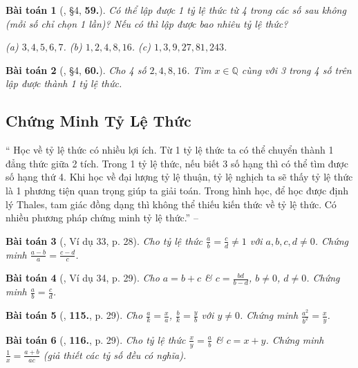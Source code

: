 \documentclass{article}
\newtheorem{baitoan}{Bài toán}
\begin{document}
\begin{baitoan}[\cite{Binh_Toan_7_tap_1}, \S4, \textbf{59.}]
	Có thể lập được 1 tỷ lệ thức từ 4 trong các số sau không (mỗi số chỉ chọn 1 lần)? Nếu có thì lập được bao nhiêu tỷ lệ thức?
	
		(a) $3,4,5,6,7$.
		(b) $1,2,4,8,16$.
		(c) $1,3,9,27,81,243$.
	
\end{baitoan}

\begin{baitoan}[\cite{Binh_Toan_7_tap_1}, \S4, \textbf{60.}]
	Cho 4 số $2,4,8,16$. Tìm $x\in\mathbb{Q}$ cùng với 3 trong 4 số trên lập được thành 1 tỷ lệ thức.
\end{baitoan}


\subsection{Chứng Minh Tỷ Lệ Thức}
``
	 Học về tỷ lệ thức có nhiều lợi ích. Từ 1 tỷ lệ thức ta có thể chuyển thành 1 đẳng thức giữa 2 tích. Trong 1 tỷ lệ thức, nếu biết 3 số hạng thì có thể tìm được số hạng thứ 4. Khi học về đại lượng tỷ lệ thuận, tỷ lệ nghịch ta sẽ thấy tỷ lệ thức là 1 phương tiện quan trọng giúp ta giải toán. Trong hình học, để học được định lý Thales, tam giác đồng dạng thì không thể thiếu kiến thức về tỷ lệ thức.
	 Có nhiều phương pháp chứng minh tỷ lệ thức.'' -- \cite[Chap. 2, \S6, p. 28]{Tuyen_Toan_7}


\begin{baitoan}[\cite{Tuyen_Toan_7}, Ví dụ 33, p. 28]
	Cho tỷ lệ thức $\frac{a}{b} = \frac{c}{d}\ne 1$ với $a,b,c,d\ne 0$. Chứng minh $\frac{a - b}{a} = \frac{c - d}{c}$.
\end{baitoan}

\begin{baitoan}[\cite{Tuyen_Toan_7}, Ví dụ 34, p. 29]
	Cho $a = b + c$ \& $c = \frac{bd}{b - d}$, $b\ne 0$, $d\ne 0$. Chứng minh $\frac{a}{b} = \frac{c}{d}$.
\end{baitoan}

\begin{baitoan}[\cite{Tuyen_Toan_7}, \textbf{115.}, p. 29]
	Cho $\frac{a}{k} = \frac{x}{a}$, $\frac{b}{k} = \frac{y}{b}$ với $y\ne 0$. Chứng minh $\frac{a^2}{b^2} = \frac{x}{y}$.
\end{baitoan}

\begin{baitoan}[\cite{Tuyen_Toan_7}, \textbf{116.}, p. 29]
	Cho tỷ lệ thức $\frac{x}{y} = \frac{a}{b}$ \& $c = x + y$. Chứng minh $\frac{1}{x} = \frac{a + b}{ac}$ (giả thiết các tỷ số đều có nghĩa).
\end{baitoan}
\end{document}
